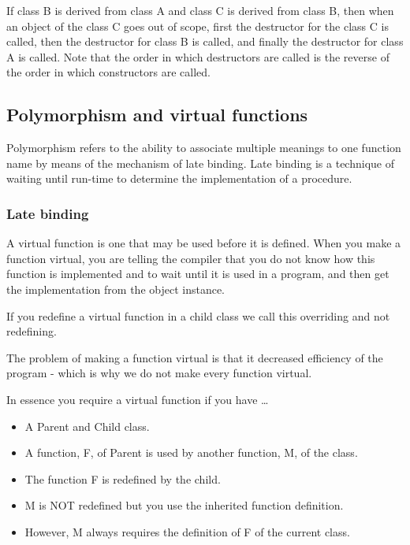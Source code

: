 If class B is derived from class A and class C is derived from class B, then when an object
of the class C goes out of scope, first the destructor for the class C is called, then the
destructor for class B is called, and finally the destructor for class A is called. Note that the
order in which destructors are called is the reverse of the order in which constructors are called.





\subsection{Polymorphism and virtual functions}
Polymorphism refers to the ability to associate multiple meanings to one function name by means
of the mechanism of late binding. Late binding is a technique of waiting until run-time to determine
the implementation of a procedure.

\subsubsection*{Late binding}
A virtual function is one that may be used before it is defined. When you make a function virtual,
you are telling the compiler that you do not know how this function is implemented and to wait until
it is used in a program, and then get the implementation from the object instance.

If you redefine a virtual function in a child class we call this overriding and not redefining.

The problem of making a function virtual is that it decreased efficiency of the program - which is
why we do not make every function virtual.

In essence you require a virtual function if you have \ldots
\begin{itemize}
	\item A Parent and Child class.
	\item A function, F, of Parent is used by another function, M, of the class.
	\item The function F is redefined by the child.
	\item M is NOT redefined but you use the inherited function definition.
	\item However, M always requires the definition of F of the current class.
\end{itemize}

